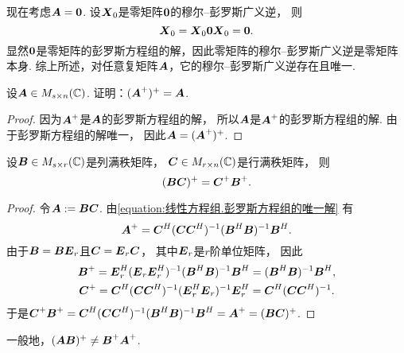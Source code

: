 \begin{remark}
现在考虑\(\boldsymbol{A} = \boldsymbol0\).
设\(\boldsymbol{X}_0\)是零矩阵\(\boldsymbol0\)的穆尔--彭罗斯广义逆，
则\begin{equation*}
	\boldsymbol{X}_0 = \boldsymbol{X}_0 \boldsymbol0 \boldsymbol{X}_0 = \boldsymbol0.
\end{equation*}
显然\(\boldsymbol0\)是零矩阵的彭罗斯方程组的解，因此零矩阵的穆尔--彭罗斯广义逆是零矩阵本身.
综上所述，对任意复矩阵\(\boldsymbol{A}\)，它的穆尔--彭罗斯广义逆存在且唯一.
\end{remark}

\begin{example}
设\(\boldsymbol{A} \in M_{s \times n}(\mathbb{C})\).
证明：\((\boldsymbol{A}^+)^+ = \boldsymbol{A}\).
\begin{proof}
因为\(\boldsymbol{A}^+\)是\(\boldsymbol{A}\)的彭罗斯方程组的解，
所以\(\boldsymbol{A}\)是\(\boldsymbol{A}^+\)的彭罗斯方程组的解.
由于彭罗斯方程组的解唯一，
因此\(\boldsymbol{A} = (\boldsymbol{A}^+)^+\).
\end{proof}
\end{example}

\begin{example}
设\(\boldsymbol{B} \in M_{s \times r}(\mathbb{C})\)是列满秩矩阵，
\(\boldsymbol{C} \in M_{r \times n}(\mathbb{C})\)是行满秩矩阵，
则\begin{equation*}
	(\boldsymbol{B} \boldsymbol{C})^+
	= \boldsymbol{C}^+ \boldsymbol{B}^+.
\end{equation*}
\begin{proof}
令\(\boldsymbol{A} := \boldsymbol{B} \boldsymbol{C}\).
由\cref{equation:线性方程组.彭罗斯方程组的唯一解} 有\begin{equation*}
	\boldsymbol{A}^+ = \boldsymbol{C}^H (\boldsymbol{C} \boldsymbol{C}^H)^{-1} (\boldsymbol{B}^H \boldsymbol{B})^{-1} \boldsymbol{B}^H.
\end{equation*}
由于\(\boldsymbol{B} = \boldsymbol{B} \boldsymbol{E}_r\)且\(\boldsymbol{C} = \boldsymbol{E}_r \boldsymbol{C}\)，
其中\(\boldsymbol{E}_r\)是\(r\)阶单位矩阵，
因此\begin{gather*}
	\boldsymbol{B}^+
	= \boldsymbol{E}_r^H (\boldsymbol{E}_r \boldsymbol{E}_r^H)^{-1} (\boldsymbol{B}^H \boldsymbol{B})^{-1} \boldsymbol{B}^H
	= (\boldsymbol{B}^H \boldsymbol{B})^{-1} \boldsymbol{B}^H, \\
	\boldsymbol{C}^+
	= \boldsymbol{C}^H (\boldsymbol{C} \boldsymbol{C}^H)^{-1} (\boldsymbol{E}_r^H \boldsymbol{E}_r)^{-1} \boldsymbol{E}_r^H
	= \boldsymbol{C}^H (\boldsymbol{C} \boldsymbol{C}^H)^{-1}.
\end{gather*}
于是\(
	\boldsymbol{C}^+ \boldsymbol{B}^+
	= \boldsymbol{C}^H (\boldsymbol{C} \boldsymbol{C}^H)^{-1}
		(\boldsymbol{B}^H \boldsymbol{B})^{-1} \boldsymbol{B}^H
	= \boldsymbol{A}^+
	= (\boldsymbol{B} \boldsymbol{C})^+
\).
\end{proof}
\end{example}
\begin{remark}
一般地，\((\boldsymbol{A} \boldsymbol{B})^+ \neq \boldsymbol{B}^+ \boldsymbol{A}^+\).
\end{remark}
